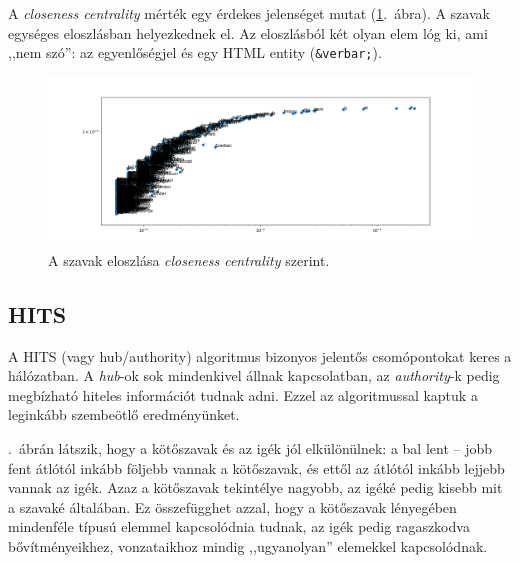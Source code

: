\documentclass{llncs}
\newcommand{\embf}[1]{\textbf{#1}}
\newcommand{\liex}[1]{\emph{#1}}
\newcommand{\XXX}[1]{{\small \color{megjcolor} [XXX #1]}}
\begin{document}
A \emph{closeness centrality} mérték egy érdekes jelenséget mutat
(\ref{fig:closeness}.\ ábra).
%
A szavak egységes eloszlásban helyezkednek el.
Az eloszlásból két olyan elem lóg ki, ami ,,nem szó'':
az egyenlőségjel és egy HTML entity ({\tt \&verbar;}).
%

\begin{figure}
\begin{center}
\includegraphics[width=25cm]{current-flow-closeness.png}
\end{center}
  \caption{A szavak eloszlása \emph{closeness centrality} szerint.}
\label{fig:closeness}
\end{figure}

\subsection{HITS}
 
A HITS (vagy hub/authority) algoritmus bizonyos jelentős csomópontokat
keres a hálózatban. A \emph{hub}-ok sok mindenkivel állnak kapcsolatban,
az \emph{authority}-k pedig megbízható hiteles információt
tudnak adni.
%
Ezzel az algoritmussal kaptuk a leginkább szembeötlő eredményünket.

.\ ábrán látszik,
hogy a kötőszavak és az igék jól elkülönülnek:
a bal lent -- jobb fent átlótól inkább följebb vannak a kötőszavak,
és ettől az átlótól inkább lejjebb vannak az igék.
Azaz a kötőszavak tekintélye nagyobb,
az igéké pedig kisebb mit a szavaké általában.
%
Ez összefügghet azzal, hogy a kötőszavak
lényegében mindenféle típusú elemmel kapcsolódnia tudnak,
az igék pedig ragaszkodva bővítményeikhez, vonzataikhoz
mindig ,,ugyanolyan'' elemekkel kapcsolódnak.
\end{document}
